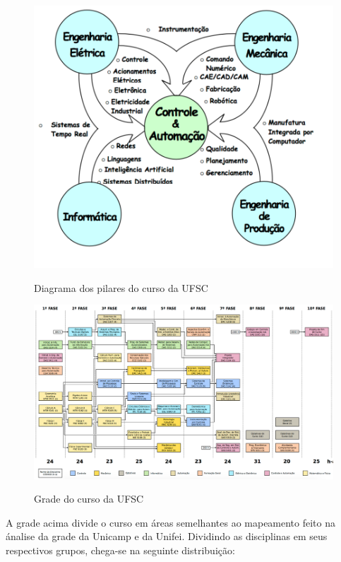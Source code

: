 \documentclass[12pt]{article} %
\begin{document}
\begin{figure}[H]
\centering
\includegraphics[scale=0.3]{pictures/ufscEstrutura.png}\\
\caption{Diagrama dos pilares do curso da UFSC}
\end{figure}

\begin{figure}[H]
\centering
\includegraphics[scale=0.2]{pictures/usfcGrade.png}\\
\caption{Grade  do curso da UFSC}
\end{figure}

A grade acima divide o curso em áreas semelhantes ao mapeamento feito na ánalise da grade da Unicamp e da Unifei. Dividindo as disciplinas em seus respectivos grupos, chega-se na seguinte distribuição:
\end{document}
